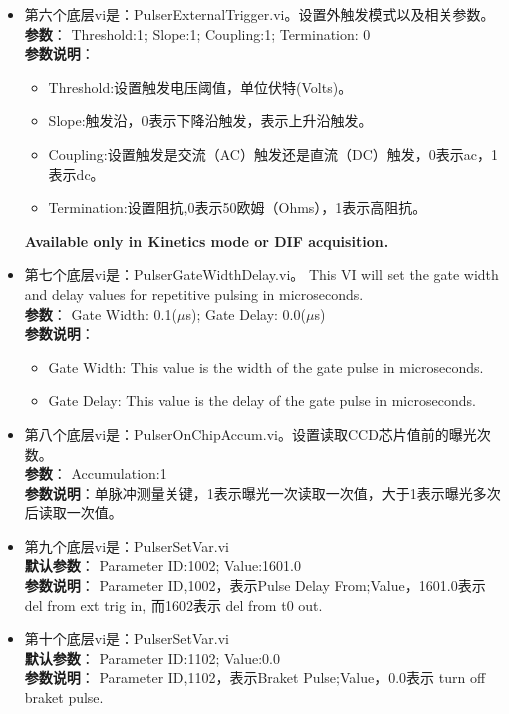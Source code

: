 \begin{itemize}
\begin{itemize}
\item 第六个底层vi是：PulserExternalTrigger.vi。设置外触发模式以及相关参数。
\\ \textbf{参数}： Threshold:1; Slope:1; Coupling:1; Termination: 0
\\ \textbf{参数说明}： 
\begin{itemize}
\item Threshold:设置触发电压阈值，单位伏特(Volts)。
\item Slope:触发沿，0表示下降沿触发，表示上升沿触发。
\item Coupling:设置触发是交流（AC）触发还是直流（DC）触发，0表示ac，1表示dc。
\item Termination:设置阻抗,0表示50欧姆（Ohms），1表示高阻抗。
\end{itemize}
\textbf{Available only in Kinetics mode or DIF acquisition.}

\item 第七个底层vi是：PulserGateWidthDelay.vi。 This VI will set the gate width and delay values for repetitive pulsing in microseconds.
\\ \textbf{参数}： Gate Width: 0.1($\mu$s); Gate Delay: 0.0($\mu$s)
\\ \textbf{参数说明}：
\begin{itemize}
\item Gate Width: This value is the width of the gate pulse in microseconds.
\item Gate Delay: This value is the delay of the gate pulse in microseconds.
\end{itemize}

\item 第八个底层vi是：PulserOnChipAccum.vi。设置读取CCD芯片值前的曝光次数。
\\ \textbf{参数}： Accumulation:1
\\ \textbf{参数说明}：单脉冲测量关键，1表示曝光一次读取一次值，大于1表示曝光多次后读取一次值。

\item 第九个底层vi是：PulserSetVar.vi
\\ \textbf{默认参数}： Parameter ID:1002; Value:1601.0
\\ \textbf{参数说明}： Parameter ID,1002，表示Pulse Delay From;Value，1601.0表示 del from ext trig in, 而1602表示 del from t0 out.

\item 第十个底层vi是：PulserSetVar.vi
\\ \textbf{默认参数}： Parameter ID:1102; Value:0.0
\\ \textbf{参数说明}： Parameter ID,1102，表示Braket Pulse;Value，0.0表示 turn off braket pulse.
\end{itemize}
\end{itemize}


